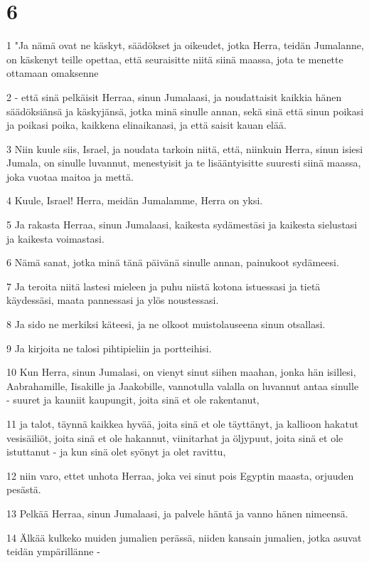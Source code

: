 \chapter{6}

\par 1 "Ja nämä ovat ne käskyt, säädökset ja oikeudet, jotka Herra, teidän Jumalanne, on käskenyt teille opettaa, että seuraisitte niitä siinä maassa, jota te menette ottamaan omaksenne
\par 2 - että sinä pelkäisit Herraa, sinun Jumalaasi, ja noudattaisit kaikkia hänen säädöksiänsä ja käskyjänsä, jotka minä sinulle annan, sekä sinä että sinun poikasi ja poikasi poika, kaikkena elinaikanasi, ja että saisit kauan elää.
\par 3 Niin kuule siis, Israel, ja noudata tarkoin niitä, että, niinkuin Herra, sinun isiesi Jumala, on sinulle luvannut, menestyisit ja te lisääntyisitte suuresti siinä maassa, joka vuotaa maitoa ja mettä.
\par 4 Kuule, Israel! Herra, meidän Jumalamme, Herra on yksi.
\par 5 Ja rakasta Herraa, sinun Jumalaasi, kaikesta sydämestäsi ja kaikesta sielustasi ja kaikesta voimastasi.
\par 6 Nämä sanat, jotka minä tänä päivänä sinulle annan, painukoot sydämeesi.
\par 7 Ja teroita niitä lastesi mieleen ja puhu niistä kotona istuessasi ja tietä käydessäsi, maata pannessasi ja ylös noustessasi.
\par 8 Ja sido ne merkiksi käteesi, ja ne olkoot muistolauseena sinun otsallasi.
\par 9 Ja kirjoita ne talosi pihtipieliin ja portteihisi.
\par 10 Kun Herra, sinun Jumalasi, on vienyt sinut siihen maahan, jonka hän isillesi, Aabrahamille, Iisakille ja Jaakobille, vannotulla valalla on luvannut antaa sinulle - suuret ja kauniit kaupungit, joita sinä et ole rakentanut,
\par 11 ja talot, täynnä kaikkea hyvää, joita sinä et ole täyttänyt, ja kallioon hakatut vesisäiliöt, joita sinä et ole hakannut, viinitarhat ja öljypuut, joita sinä et ole istuttanut - ja kun sinä olet syönyt ja olet ravittu,
\par 12 niin varo, ettet unhota Herraa, joka vei sinut pois Egyptin maasta, orjuuden pesästä.
\par 13 Pelkää Herraa, sinun Jumalaasi, ja palvele häntä ja vanno hänen nimeensä.
\par 14 Älkää kulkeko muiden jumalien perässä, niiden kansain jumalien, jotka asuvat teidän ympärillänne -
